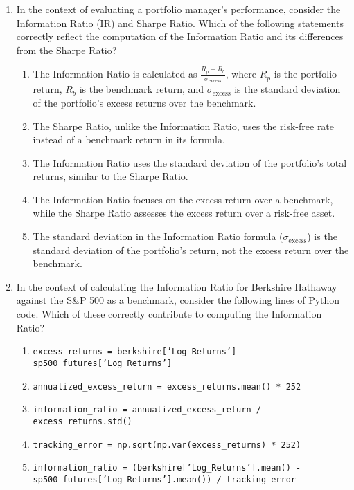 \documentclass{article}
\begin{document}
\begin{enumerate}
    \item In the context of evaluating a portfolio manager's performance, consider the Information Ratio (IR) and Sharpe Ratio. Which of the following statements correctly reflect the computation of the Information Ratio and its differences from the Sharpe Ratio?
    \begin{enumerate}
        \item The Information Ratio is calculated as \(\frac{R_p - R_b}{\sigma_{\text{excess}}}\), where \(R_p\) is the portfolio return, \(R_b\) is the benchmark return, and \(\sigma_{\text{excess}}\) is the standard deviation of the portfolio's excess returns over the benchmark.
        \item The Sharpe Ratio, unlike the Information Ratio, uses the risk-free rate instead of a benchmark return in its formula.
        \item The Information Ratio uses the standard deviation of the portfolio's total returns, similar to the Sharpe Ratio.
        \item The Information Ratio focuses on the excess return over a benchmark, while the Sharpe Ratio assesses the excess return over a risk-free asset.
        \item The standard deviation in the Information Ratio formula (\(\sigma_{\text{excess}}\)) is the standard deviation of the portfolio's return, not the excess return over the benchmark.
    \end{enumerate}

    \item In the context of calculating the Information Ratio for Berkshire Hathaway against the S\&P 500 as a benchmark, consider the following lines of Python code. Which of these correctly contribute to computing the Information Ratio?
    \begin{enumerate}
        \item \texttt{excess\_returns = berkshire['Log\_Returns'] - sp500\_futures['Log\_Returns']}
        \item \texttt{annualized\_excess\_return = excess\_returns.mean() * 252}
        \item \texttt{information\_ratio = annualized\_excess\_return / excess\_returns.std()}
        \item \texttt{tracking\_error = np.sqrt(np.var(excess\_returns) * 252)}
        \item \texttt{information\_ratio = (berkshire['Log\_Returns'].mean() - \\ sp500\_futures['Log\_Returns'].mean()) / tracking\_error}
    \end{enumerate}


\end{enumerate}
\end{document}

